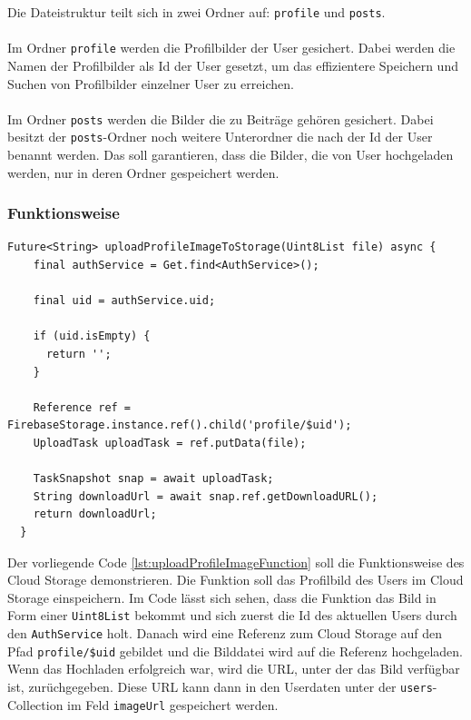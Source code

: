 Die Dateistruktur teilt sich in zwei Ordner auf: \texttt{profile} und \texttt{posts}.
\\\\
Im Ordner \texttt{profile} werden die Profilbilder der User gesichert. Dabei werden die Namen der Profilbilder als Id der User gesetzt, um das effizientere Speichern und Suchen von Profilbilder einzelner User zu erreichen.
\\\\
Im Ordner \texttt{posts} werden die Bilder die zu Beiträge gehören gesichert. Dabei besitzt der \texttt{posts}-Ordner noch weitere Unterordner die nach der Id der User benannt werden. Das soll garantieren, dass die Bilder, die von User hochgeladen werden, nur in deren Ordner gespeichert werden.

\subsubsection{Funktionsweise}

\begin{lstlisting}[caption=uploadProfileImageToStorage Funktion,label=lst:uploadProfileImageFunction]
  Future<String> uploadProfileImageToStorage(Uint8List file) async {
    final authService = Get.find<AuthService>();

    final uid = authService.uid;

    if (uid.isEmpty) {
      return '';
    }

    Reference ref = FirebaseStorage.instance.ref().child('profile/$uid');
    UploadTask uploadTask = ref.putData(file);

    TaskSnapshot snap = await uploadTask;
    String downloadUrl = await snap.ref.getDownloadURL();
    return downloadUrl;
  }

\end{lstlisting}
Der vorliegende Code \ref{lst:uploadProfileImageFunction} soll die Funktionsweise des Cloud Storage demonstrieren. Die Funktion soll das Profilbild des Users im Cloud Storage einspeichern. Im Code lässt sich sehen, dass die Funktion das Bild in Form einer \texttt{Uint8List} bekommt und sich zuerst die Id des aktuellen Users durch den \texttt{AuthService} holt. Danach wird eine Referenz zum Cloud Storage auf den Pfad \texttt{profile/\$uid} gebildet und die Bilddatei wird auf die Referenz hochgeladen. Wenn das Hochladen erfolgreich war, wird die URL, unter der das Bild verfügbar ist, zurüchgegeben. Diese URL kann dann in den Userdaten unter der \texttt{users}-Collection im Feld \texttt{imageUrl} gespeichert werden.

